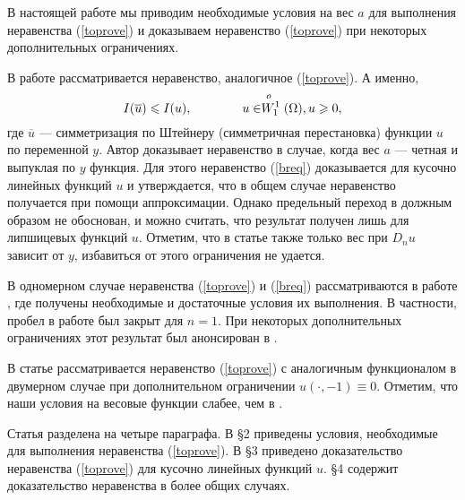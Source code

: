 В настоящей работе мы приводим необходимые условия на вес $a$ для выполнения неравенства (\ref{toprove})
и доказываем неравенство (\ref{toprove}) при некоторых дополнительных ограничениях.

В работе \cite{Brock} рассматривается неравенство, аналогичное (\ref{toprove}).
А именно,
\begin{equation}
\label{breq}
I( \overline{u} ) \le I( u ), \qquad \qquad u \in \Wf( \Omega ), u \ge 0,
\end{equation}
где $\overline{u}$ --- симметризация по Штейнеру (симметричная перестановка) функции $u$ по переменной $y$.
Автор \cite{Brock} доказывает неравенство в случае, когда вес $a$ --- четная и выпуклая по $y$ функция.
Для этого неравенство (\ref{breq}) доказывается для кусочно линейных функций $u$
и утверждается, что в общем случае неравенство получается при помощи аппроксимации.
Однако предельный переход в \cite{Brock} должным образом не обоснован,
и можно считать, что результат получен лишь для липшицевых функций $u$.
Отметим, что в статье \cite{Brock} также только вес при $D_n u$ зависит от $y$, избавиться от этого ограничения не удается.

В одномерном случае неравенства (\ref{toprove}) и (\ref{breq}) рассматриваются в работе \cite{1dim},
где получены необходимые и достаточные условия их выполнения.
В частности, пробел в работе \cite{Brock} был закрыт для $n = 1$.
При некоторых дополнительных ограничениях этот результат был анонсирован в \cite{DAN}.

В статье \cite{Landes} рассматривается неравенство (\ref{toprove}) с аналогичным функционалом в двумерном случае
при дополнительном ограничении $u(\cdot, -1) \equiv 0$.
Отметим, что наши условия на весовые функции слабее, чем в \cite{Landes}.

Статья разделена на четыре параграфа.
В \S2 приведены условия, необходимые для выполнения неравенства (\ref{toprove}).
В \S3 приведено доказательство неравенства (\ref{toprove}) для кусочно линейных функций $u$.
\S4 содержит доказательство неравенства в более общих случаях.
